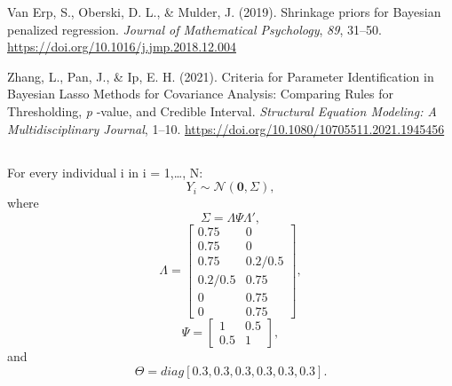 \documentclass[
  man, donotrepeattitle,floatsintext]{apa6}
\newlength{\cslhangindent}
\newlength{\cslentryspacingunit} %
\newenvironment{CSLReferences}[2] %
 {%
  \setlength{\parindent}{0pt}
  \ifodd #1
  \let\oldpar\par
  \def\par{\hangindent=\cslhangindent\oldpar}
  \fi
  \setlength{\parskip}{#2\cslentryspacingunit}
 }%
 {}
\begin{document}
\begin{CSLReferences}{1}{0}
\leavevmode{}%
Van Erp, S., Oberski, D. L., \& Mulder, J. (2019). Shrinkage priors for {Bayesian} penalized regression. \emph{Journal of Mathematical Psychology}, \emph{89}, 31--50. \url{https://doi.org/10.1016/j.jmp.2018.12.004}

\leavevmode{}%
Zhang, L., Pan, J., \& Ip, E. H. (2021). Criteria for {Parameter} {Identification} in {Bayesian} {Lasso} {Methods} for {Covariance} {Analysis}: {Comparing} {Rules} for {Thresholding}, \emph{p} -value, and {Credible} {Interval}. \emph{Structural Equation Modeling: A Multidisciplinary Journal}, 1--10. \url{https://doi.org/10.1080/10705511.2021.1945456}

\end{CSLReferences}

\endgroup


\clearpage
\makeatletter
\efloat@restorefloats
\makeatother


\begin{appendix}
\section{}
For every individual i in i = 1,\ldots, N:
\[Y_i \sim \mathcal{N}(\mathbf{0}, \Sigma),\] where
\[\Sigma = \Lambda\Psi\Lambda',\] \[\Lambda = 
    \begin{bmatrix}
    0.75 & 0 \\
    0.75 & 0 \\
    0.75 & 0.2/0.5 \\
    0.2/0.5 & 0.75 \\
    0 & 0.75 \\
    0 & 0.75
    \end{bmatrix},\] \[\Psi =
    \begin{bmatrix}
     1 & 0.5 \\
     0.5 & 1
    \end{bmatrix}
,\] and \[\Theta = diag[0.3, 0.3, 0.3, 0.3, 0.3, 0.3].\]
\end{appendix}

\clearpage
\makeatletter
\efloat@restorefloats
\makeatother
\end{document}
